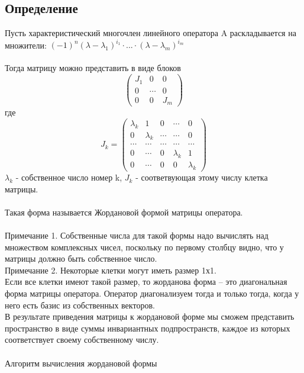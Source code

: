 \documentclass[12pt]{article}
\begin{document}
\subsection{Определение}

Пусть характеристический многочлен линейного оператора A раскладывается на множители:
\((-1)^n(\lambda-\lambda_1)^{i_1}\cdot...\cdot(\lambda-\lambda_m)^{i_m}\)\\\\
Тогда матрицу можно представить в виде блоков
\[
    \begin{pmatrix}
        J_1 & 0      & 0   \\
        0   & \cdots & 0   \\
        0   & 0      & J_m
    \end{pmatrix}
\] где
\[
    J_k = \begin{pmatrix}
        \lambda_k & 1         & 0      & \cdots    & 0         \\
        0         & \lambda_k & \cdots & \cdots    & 0         \\
        \cdots    & \cdots    & \cdots & \cdots    & \cdots    \\
        0         & \cdots    & 0      & \lambda_k & 1         \\
        0         & \cdots    & 0      & 0         & \lambda_k
    \end{pmatrix}
\]
$\lambda_k$ - собственное число номер k, $J_k$ - соответвующая этому числу клетка матрицы.\\\\
Такая форма называется Жордановой формой матрицы оператора. \\\\
Примечание 1. Собственные числа для такой формы надо вычислять над множеством комплексных чисел,
поскольку по первому столбцу видно, что у матрицы должно быть собственное число. \\
Примечание 2. Некоторые клетки могут иметь размер 1х1.\\
Если все клетки имеют такой размер, то жорданова форма – это диагональная форма матрицы оператора.
Оператор диагонализуем тогда и только тогда, когда у него есть базис из собственных векторов.\\
В результате приведения матрицы к жордановой форме мы сможем представить пространство в виде суммы
инвариантных подпространств, каждое из которых соответствует своему собственному числу.\\\\
Алгоритм вычисления жордановой формы\\\\
\end{document}
